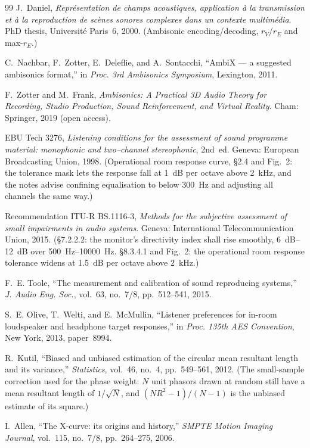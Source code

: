 \begin{thebibliography}{99}
J.~Daniel, \textit{Représentation de champs acoustiques, application à la
transmission et à la reproduction de scènes sonores complexes dans un contexte
multimédia}. PhD thesis, Université Paris~6, 2000. (Ambisonic encoding/decoding,
$r_V$/$r_E$ and max-$r_E$.)

C.~Nachbar, F.~Zotter, E.~Deleflie, and A.~Sontacchi, ``AmbiX --- a suggested
ambisonics format,'' in \textit{Proc. 3rd Ambisonics Symposium}, Lexington, 2011.

F.~Zotter and M.~Frank, \textit{Ambisonics: A Practical 3D Audio Theory for
Recording, Studio Production, Sound Reinforcement, and Virtual Reality}. Cham:
Springer, 2019 (open access).

EBU Tech 3276, \textit{Listening conditions for the assessment of sound
programme material: monophonic and two--channel stereophonic}, 2nd~ed.
Geneva: European Broadcasting Union, 1998. (Operational room response curve,
\S2.4 and Fig.~2: the tolerance mask lets the response fall at
\SI{1}{\dB} per octave above \SI{2}{\kilo\hertz}, and the notes advise
confining equalisation to below \SI{300}{\hertz} and adjusting all channels
the same way.)

Recommendation ITU-R BS.1116-3, \textit{Methods for the subjective assessment
of small impairments in audio systems}. Geneva: International
Telecommunication Union, 2015. (\S7.2.2.2: the monitor's directivity index
shall rise smoothly, \SIrange{6}{12}{\dB} over
\SIrange{500}{10000}{\hertz}. \S8.3.4.1 and Fig.~2: the operational room
response tolerance widens at \SI{1.5}{\dB} per octave above
\SI{2}{\kilo\hertz}.)

F.~E. Toole, ``The measurement and calibration of sound reproducing systems,''
\textit{J. Audio Eng. Soc.}, vol.~63, no.~7/8, pp.~512--541, 2015.

S.~E. Olive, T.~Welti, and E.~McMullin, ``Listener preferences for in-room
loudspeaker and headphone target responses,'' in \textit{Proc. 135th AES
Convention}, New York, 2013, paper~8994.

R.~Kutil, ``Biased and unbiased estimation of the circular mean resultant
length and its variance,'' \textit{Statistics}, vol.~46, no.~4, pp.~549--561,
2012. (The small-sample correction used for the phase weight: $N$ unit phasors
drawn at random still have a mean resultant length of $1/\sqrt N$, and
$(N R^2-1)/(N-1)$ is the unbiased estimate of its square.)

I.~Allen, ``The X-curve: its origins and history,'' \textit{SMPTE Motion
Imaging Journal}, vol.~115, no.~7/8, pp.~264--275, 2006.

\end{thebibliography}
